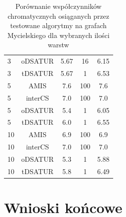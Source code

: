 \documentclass[10pt,a4paper]{article}
\begin{document}
\begin{table}[H]
\begin{minipage}{\linewidth}
\begin{tabular}{|l|c|c|c|c|}
				3 & oDSATUR & 5.67 & 16 & 6.15 \\
				3 & tDSATUR & 5.67 & 1 & 6.53 \\
				\hline
				5 & AMIS & 7.6 & 100 & 7.6 \\
				5 & interCS & 7.0 & 100 & 7.0 \\
				5 & oDSATUR & 5.4 & 1 & 6.05 \\
				5 & tDSATUR & 6.0 & 1 & 6.55 \\
				\hline
				10 & AMIS & 6.9 & 100 & 6.9 \\
				10 & interCS & 7.0 & 100 & 7.0 \\
				10 & oDSATUR & 5.3 & 1 & 5.88 \\
				10 & tDSATUR & 5.8 & 1 & 6.49 \\
				\hline
			\end{tabular}
			\caption{$M(7)$}
		\end{minipage}
		\caption{Porównanie współczynników chromatycznych osiąganych przez testowane algorytmy na grafach Mycielskiego dla wybranych ilości warstw }
	\end{table}
	
	\section{Wnioski końcowe}
	
\end{document}
